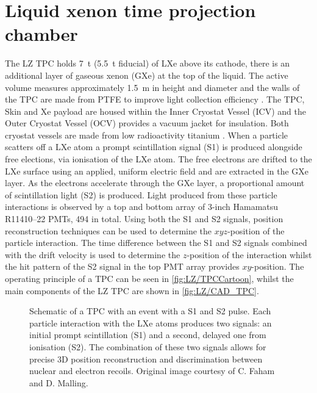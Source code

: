 \section{Liquid xenon time projection chamber}\label{sec:LZ/LXeTPC}
The LZ TPC holds 7~t (5.5~t fiducial) of LXe above its cathode, there is an additional layer of gaseous xenon (GXe) at the top of the liquid. The active volume measures approximately 1.5~m in height and diameter and the walls of the TPC are made from PTFE to improve light collection efficiency \cite{LZNIMA}. The TPC, Skin and Xe payload are housed within the Inner Cryostat Vessel (ICV) and the Outer Cryostat Vessel (OCV) provides a vacuum jacket for insulation. Both cryostat vessels are made from low radioactivity titanium \cite{LZ:2017iwn}. When a particle scatters off a LXe atom a prompt scintillation signal (S1) is produced alongside free elections, via ionisation of the LXe atom. The free electrons are drifted to the LXe surface using an applied, uniform electric field and are extracted in the GXe layer. As the electrons accelerate through the GXe layer, a proportional amount of scintillation light (S2) is produced. Light produced from these particle interactions is observed by a top and bottom array of 3-inch Hamamatsu R11410–22 PMTs, 494 in total. Using both the S1 and S2 signals, position reconstruction techniques can be used to determine the $xyz$-position of the particle interaction. The time difference between the S1 and S2 signals combined with the drift velocity is used to determine the $z$-position of the interaction whilst the hit pattern of the S2 signal in the top PMT array provides $xy$-position. The operating principle of a TPC can be seen in \autoref{fig:LZ/TPCCartoon}, whilst the main components of the LZ TPC are shown in \autoref{fig:LZ/CAD_TPC}.
\begin{figure}[!ht]
    \centering
    
    \caption{Schematic of a TPC with an event with a S1 and S2 pulse. Each particle interaction with the LXe atoms produces two signals: an initial prompt scintillation (S1) and a second, delayed one from ionisation (S2). The combination of these two signals allows for precise 3D position reconstruction and discrimination between nuclear and electron recoils. Original image courtesy of C. Faham and D. Malling.}
    \label{fig:LZ/TPCCartoon}
\end{figure}

